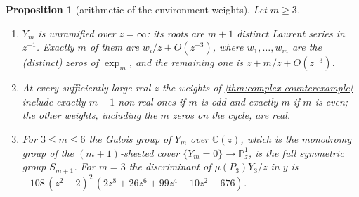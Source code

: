 \documentclass[11pt]{amsart}
\theoremstyle{plain}
\newtheorem{proposition}[theorem]{Proposition}
\theoremstyle{definition}
\theoremstyle{remark}
\numberwithin{equation}{section}
\newcommand{\CC}{\mathbb{C}}
\begin{document}
\begin{proposition}[arithmetic of the environment weights]\label{prop:Ym-arithmetic}
Let $m\ge3$.
\begin{enumerate}[label=\textup{(\arabic*)}]
\item $Y_m$ is unramified over $z=\infty$: its roots are $m+1$ distinct Laurent series in $z^{-1}$. Exactly $m$ of them are $w_i/z+O(z^{-3})$, where $w_1,\dots,w_m$ are the \textup{(}distinct\textup{)} zeros of $\exp_m$, and the remaining one is $z+m/z+O(z^{-3})$.
\item At every sufficiently large real $z$ the weights of \cref{thm:complex-counterexample} include exactly $m-1$ non-real ones if $m$ is odd and exactly $m$ if $m$ is even; the other weights, including the $m$ zeros on the cycle, are real.
\item For $3\le m\le6$ the Galois group of $Y_m$ over $\CC(z)$, which is the monodromy group of the $(m+1)$-sheeted cover $\{Y_m=0\}\to\mathbb P^{1}_z$, is the full symmetric group $S_{m+1}$. For $m=3$ the discriminant of $\mu(P_3)Y_3/z$ in $y$ is $-108\,(z^{2}-2)^{2}\,(2z^{8}+26z^{6}+99z^{4}-10z^{2}-676)$.
\end{enumerate}
\end{proposition}
\end{document}
